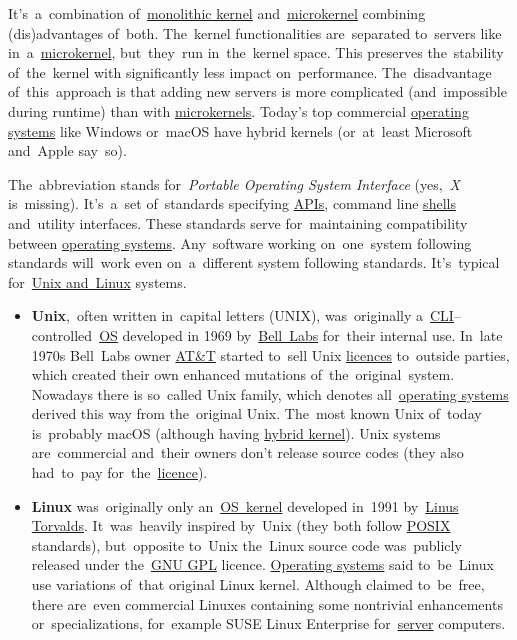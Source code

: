 \label{hybridkernel}
It's~a~combination of~\hyperref[monolithickernel]{monolithic kernel} and~\hyperref[microkernel]{microkernel} combining (dis)advantages of~both. The~kernel functionalities are~separated to~servers like in~a~\hyperref[microkernel]{microkernel}, but~they~run in~the~kernel space. This preserves the~stability of~the~kernel with significantly less impact on~performance. The~disadvantage of~this~approach is that adding new servers is more complicated (and~impossible during runtime) than with \hyperref[microkernel]{microkernels}. Today's top commercial \hyperref[os]{operating systems} like Windows or~macOS have hybrid kernels (or~at~least Microsoft and~Apple say~so).

\label{posix}
The~abbreviation stands for~\textit{Portable Operating System Interface} (yes,~\textit{X} is~missing). It's~a~set of~standards specifying \hyperref[api]{APIs}, command line \hyperref[shellcligui]{shells} and~utility interfaces. These standards serve for~maintaining compatibility between \hyperref[os]{operating systems}. Any~software working on~one~system following standards will~work even on~a~different system following standards. It's~typical for~\hyperref[unixlinux]{Unix and~Linux} systems.

\label{unixlinux}
\begin{itemize}
    \item \textbf{Unix},~often written in~capital letters (UNIX), was~originally a~\hyperref[shellcligui]{CLI}--controlled~\hyperref[os]{OS} developed in 1969 by~\href{https://en.wikipedia.org/wiki/Bell_Labs}{Bell~Labs} for~their internal use. In~late 1970s Bell~Labs owner \href{https://en.wikipedia.org/wiki/AT\%26T}{AT\&T} started to~sell Unix \hyperref[licencing]{licences} to~outside parties, which created their own enhanced mutations of~the~original~system. Nowadays there is so~called Unix family, which denotes all~\hyperref[os]{operating systems} derived this way from the~original Unix. The~most known Unix of~today is~probably macOS (although having \hyperref[hybridkernel]{hybrid kernel}). \warningnonl Unix systems are~commercial and~their owners don't release source codes (they also had~to~pay for~the~\hyperref[licencing]{licence}).
    \item \textbf{Linux} was~originally only an~\hyperref[kernel]{OS~kernel} developed in~1991 by~\href{https://en.wikipedia.org/wiki/Linus_Torvalds}{Linus Torvalds}. It~was~heavily inspired by~Unix (they both follow \hyperref[posix]{POSIX} standards), but~opposite to~Unix the~Linux source code was~publicly released under the~\hyperref[gpl]{GNU GPL} licence. \hyperref[os]{Operating systems} said to~be~Linux use variations of~that original Linux kernel. Although claimed to~be~free, there are~even commercial Linuxes containing some nontrivial enhancements or~specializations, for~example SUSE Linux Enterprise for~\hyperref[server]{server} computers.
\end{itemize}
\newpage

